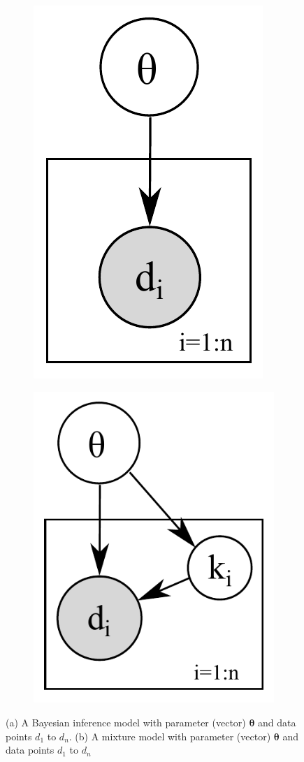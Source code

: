 \begin{figure}
\centering
\begin{subfigure}{.40\textwidth}
\centering
\includegraphics[width=.28\textwidth]{pic/naive.pdf}
\caption{}
\label{fig:naive}
\end{subfigure}
\begin{subfigure}{.40\textwidth}
\centering
  \includegraphics[width=.35\textwidth]{pic/naive-mix2.pdf}
\caption{}
\label{fig:naive.mix}
\end{subfigure}
\caption{\footnotesize 
(a) A Bayesian inference model with parameter (vector) $\boldsymbol\theta$ and data points $d_1$ to $d_n$.
(b) A mixture model with parameter (vector) $\boldsymbol\theta$ and data points $d_1$ to $d_n$ 
}
\end{figure}

